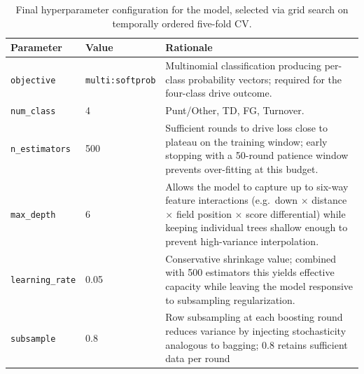 \begin{table}[htbp]
  \centering
  \caption{Final hyperparameter configuration for the \xscore{} model,
           selected via grid search on temporally ordered five-fold CV.}
  \label{tab:hyperparams}
  \small
  \begin{tabularx}{\textwidth}{llX}
    \toprule
    \textbf{Parameter} & \textbf{Value} & \textbf{Rationale} \\
    \midrule
    \texttt{objective}           & \texttt{multi:softprob}
                                         & Multinomial classification producing
                                           per-class probability vectors; required
                                           for the four-class drive outcome. \\[4pt]
    \texttt{num\_class}          & 4     & Punt/Other, TD, FG, Turnover. \\[4pt]
    \texttt{n\_estimators}       & 500   & Sufficient rounds to drive loss close to
                                           plateau on the training window; early
                                           stopping with a 50-round patience window
                                           prevents over-fitting at this budget. \\[4pt]
    \texttt{max\_depth}          & 6     & Allows the model to capture up to
                                           six-way feature interactions (e.g.\
                                           down $\times$ distance $\times$ field
                                           position $\times$ score differential)
                                           while keeping individual trees shallow
                                           enough to prevent high-variance
                                           interpolation. \\[4pt]
    \texttt{learning\_rate}      & 0.05  & Conservative shrinkage value; combined
                                           with 500 estimators this yields
                                           effective capacity while leaving the
                                           model responsive to subsampling
                                           regularization. \\[4pt]
    \texttt{subsample}           & 0.8   & Row subsampling at each boosting round
                                           reduces variance by injecting
                                           stochasticity analogous to bagging;
                                           $0.8$ retains sufficient data per round

\end{tabularx}
\end{table}
